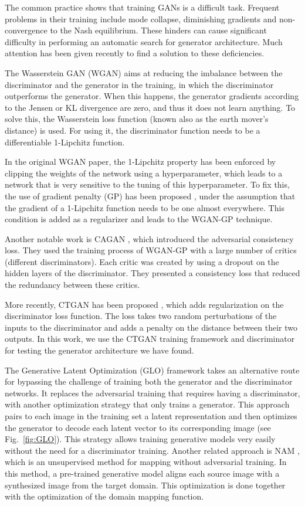 \documentclass[10pt,twocolumn,letterpaper]{article}
\begin{document}
The common practice shows that training GANs is a difficult task. Frequent problems in their training include mode collapse, diminishing gradients and non-convergence to the Nash equilibrium. These hinders can cause significant difficulty in performing an automatic search for generator architecture. Much attention has been given recently to find a solution to these deficiencies. 

The Wasserstein GAN (WGAN) \cite{wgan} aims at reducing the imbalance between the discriminator and the generator in the training, in which the discriminator outperforms the generator. When this happens, the generator gradients according to the Jensen or KL divergence are zero, and thus it does not learn anything. To solve this, the Wasserstein loss function (known also as the earth mover's distance) is used. For using it, the discriminator function needs to be a differentiable 1-Lipchitz function. 

In the original WGAN paper, the 1-Lipchitz property has been enforced by clipping the weights of the network using a hyperparameter, which leads to a network that is very sensitive to the tuning of this hyperparameter. To fix this, the use of gradient penalty (GP) has been proposed \cite{wgan-gp}, under the assumption that the gradient of a 1-Lipchitz function needs to be one almost everywhere. This condition is added as a regularizer and leads to the WGAN-GP technique. 

Another notable work is CAGAN \cite{cagan}, which introduced the adversarial consistency loss. They used the training process of WGAN-GP with a large number of critics (different discriminators). Each critic was created by using a dropout on the hidden layers of the discriminator. They presented a consistency loss that reduced the redundancy between these critics.

More recently, CTGAN has been proposed \cite{ctagn}, which adds regularization on the discriminator loss function. The loss takes two random perturbations of the inputs to the discriminator and adds a penalty on the distance between their two outputs. In this work, we use the CTGAN training framework and discriminator for testing the generator architecture we have found.

The Generative Latent Optimization (GLO) framework \cite{glo} takes an alternative route for bypassing the challenge of training both the generator and the discriminator networks. It replaces the adversarial training that requires having a discriminator, with another optimization strategy that only trains a generator. This approach pairs to each image in the training set a latent representation and then optimizes the generator to decode each latent vector to its corresponding image (see Fig.~\ref{fig:GLO}). This strategy allows training generative models very easily without the need for a discriminator training. 
Another related approach is NAM \cite{Hoshen18NAM}, which is an unsupervised method for mapping without adversarial training.
In this method, a pre-trained generative model aligns each source image with a synthesized image from the target domain. This optimization is done together with the optimization of the domain mapping function.
\end{document}
